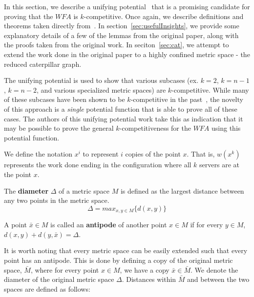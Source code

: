 In this section, we describe a unifying potential~\cite{unifyingPotential2021} that is a promising candidate for proving that the $WFA$ is $k$-competitive. Once again, we describe definitions and theorems taken directly from~\cite{unifyingPotential2021}. In section~\ref{sec:usefulInsights}, we provide some explanatory details of a few of the lemmas from the original paper, along with the proofs taken from the original work. In seciton~\ref{sec:cat}, we attempt to extend the work done in the original paper to a highly confined metric space - the reduced caterpillar graph.

The unifying potential is used to show that various subcases (ex. $k=2$, $k=n-1$, $k=n-2$, and various specialized metric spaces) are $k$-competitive. While many of these subcases have been shown to be $k$-competitive in the past~\cite{server1991, server2009, server1996, server2004, server2002}, the novelty of this approach is a \textit{single} potential function that is able to prove all of these cases. The authors of this unifying potential work take this as indication that it may be possible to prove the general $k$-competitiveness for the $WFA$ using this potential function.

\begin{definition}
    We define the notation $x^i$ to represent $i$ copies of the point $x$. That is, $w(x^k)$ represents the work done ending in the configuration where all $k$ servers are at the point $x$.
\end{definition}

\begin{definition}
    The \textbf{diameter} $\Delta$ of a metric space $M$ is defined as the largest distance between any two points in the metric space.
    \begin{equation*}
        \Delta = max_{x, y \in M} \{ d(x,y)\}
    \end{equation*}
\end{definition}

\begin{definition}
    A point $\bar{x} \in M$ is called an \textbf{antipode} of another point $x \in M$ if for every $y \in M$, $d(x,y) + d(y, \bar{x}) = \Delta$.
\end{definition}

It is worth noting that every metric space can be easily extended such that every point has an antipode. This is done by defining a copy of the original metric space, $\bar{M}$, where for every point $x \in M$, we have a copy $\bar{x} \in \bar{M}$. We denote the diameter of the original metric space $\Delta$. Distances within $\bar{M}$ and between the two spaces are defined as follows:

